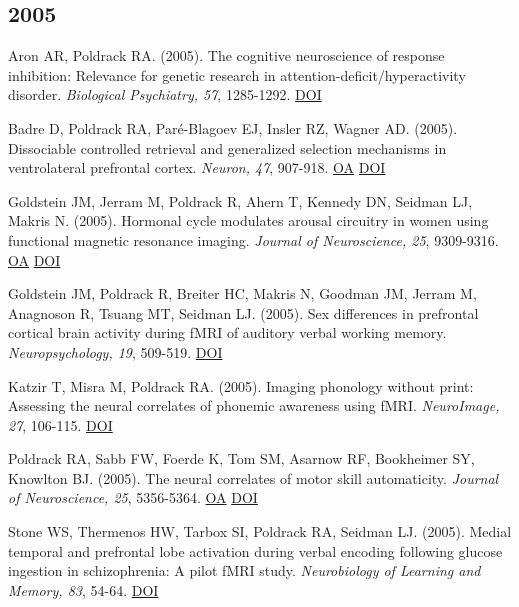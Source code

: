 \documentclass[10pt, letterpaper]{article}
\begin{document}
\subsection*{2005}Aron AR, Poldrack RA.  (2005). The cognitive neuroscience of response inhibition: Relevance for genetic research in attention-deficit/hyperactivity disorder. \textit{Biological Psychiatry, 57}, 1285-1292. \href{https://doi.org/10.1016/j.biopsych.2004.10.026}{DOI} \vspace{2mm}

Badre D, Poldrack RA, Paré-Blagoev EJ, Insler RZ, Wagner AD.  (2005). Dissociable controlled retrieval and generalized selection mechanisms in ventrolateral prefrontal cortex. \textit{Neuron, 47}, 907-918. \href{https://doi.org/10.1016/j.neuron.2005.07.023}{OA} \href{https://doi.org/10.1016/j.neuron.2005.07.023}{DOI} \vspace{2mm}

Goldstein JM, Jerram M, Poldrack R, Ahern T, Kennedy DN, Seidman LJ, Makris N.  (2005). Hormonal cycle modulates arousal circuitry in women using functional magnetic resonance imaging. \textit{Journal of Neuroscience, 25}, 9309-9316. \href{https://www.ncbi.nlm.nih.gov/pmc/articles/PMC6725775}{OA} \href{https://doi.org/10.1523/jneurosci.2239-05.2005}{DOI} \vspace{2mm}

Goldstein JM, Poldrack R, Breiter HC, Makris N, Goodman JM, Jerram M, Anagnoson R, Tsuang MT, Seidman LJ.  (2005). Sex differences in prefrontal cortical brain activity during fMRI of auditory verbal working memory. \textit{Neuropsychology, 19}, 509-519. \href{https://doi.org/10.1037/0894-4105.19.4.509}{DOI} \vspace{2mm}

Katzir T, Misra M, Poldrack RA.  (2005). Imaging phonology without print: Assessing the neural correlates of phonemic awareness using fMRI. \textit{NeuroImage, 27}, 106-115. \href{https://doi.org/10.1016/j.neuroimage.2005.04.013}{DOI} \vspace{2mm}

Poldrack RA, Sabb FW, Foerde K, Tom SM, Asarnow RF, Bookheimer SY, Knowlton BJ.  (2005). The neural correlates of motor skill automaticity. \textit{Journal of Neuroscience, 25}, 5356-5364. \href{https://www.ncbi.nlm.nih.gov/pmc/articles/PMC6725010}{OA} \href{https://doi.org/10.1523/jneurosci.3880-04.2005}{DOI} \vspace{2mm}

Stone WS, Thermenos HW, Tarbox SI, Poldrack RA, Seidman LJ.  (2005). Medial temporal and prefrontal lobe activation during verbal encoding following glucose ingestion in schizophrenia: A pilot fMRI study. \textit{Neurobiology of Learning and Memory, 83}, 54-64. \href{https://doi.org/10.1016/j.nlm.2004.07.009}{DOI} \vspace{2mm}
\end{document}
